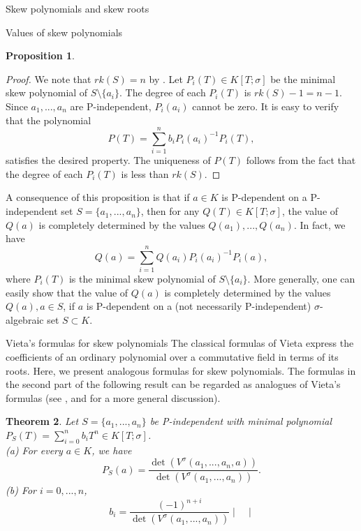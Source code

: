 \documentclass[11pt,a4paper]{article}
\theoremstyle{theorem}
\newtheorem{theorem}{Theorem}[section]
\newtheorem{proposition}[theorem]{Proposition}
\numberwithin{equation}{section}
\newcommand{\s}{\sigma}
\begin{document}
\begin{section}{Skew polynomials and skew roots}
\begin{subsection}{Values of skew polynomials}
\begin{proposition}
	 \end{proposition}
	 \begin{proof}
	 	We note that $rk(S)=n$ by  \cite[Lemma 12]{lam1985general}. Let $P_i(T)\in K[T;\s]$ be the minimal skew polynomial of $S\setminus \{a_i\}$. The degree of each $P_i(T)$ is $rk (S)-1=n-1$. Since $a_1,...,a_n$ are P-independent, $P_i(a_i)$ cannot be zero. It is easy to verify that the polynomial 
	 	$$P(T)=\sum_{i=1}^nb_iP_i(a_i)^{-1}P_i(T),$$
	 	satisfies the desired property. The uniqueness of $P(T)$ follows from the fact that  the degree of each $P_i(T)$ is less than $rk (S)$. 
	 \end{proof}  
 	A consequence of this proposition is that if $a\in K$ is P-dependent on a P-independent set $S=\{a_1,...,a_n\}$, then for any $Q(T)\in K[T;\s]$, the value of $Q(a)$ is completely determined by the values $Q(a_1),...,Q(a_n)$. In fact, we have 
 	$$Q(a)=\sum_{i=1}^nQ(a_i)P_i(a_i)^{-1}P_i(a),$$
	where $P_i(T)$ is the minimal skew polynomial of $S\setminus \{a_i\}$. More generally, one can easily show that the value of $Q(a)$ is completely determined by the values $Q(a), a\in S$, if $a$ is P-dependent on a (not necessarily P-independent) $\s$-algebraic set $S\subset K$.   	 
\end{subsection}
\begin{subsection}{Vieta's formulas for skew polynomials }
	The classical formulas of Vieta express the coefficients of an ordinary polynomial over a commutative field in terms of its roots. 
	 Here, we present analogous formulas for skew polynomials.    	
	The formulas in the second part of the following result can be regarded as analogues of Vieta's formulas (see  \cite{delenclos2007noncommutative}, \cite[Section 7.2]{Gelfandetal1995study} and \cite{gelfand1996noncommutative} for a more general discussion). 
	\begin{theorem}\label{(T)Vieta}
		Let $S=\{a_1,...,a_n\}$ be P-independent with minimal polynomial $P_S(T)=\sum_{i=0}^nb_i T^n\in K[T;\s]$. \\
		(a) For every $a\in K$, we have
		$$P_S(a)=\frac{ \det \left( V^\s(a_1,...,a_n,a)\right)  }{\det \left( V^\s(a_1,...,a_n)\right) }.$$
		(b) For $i=0,...,n$, 
		\begin{equation}\label{(F)MinimalVandermonde}
			b_i=\frac{(-1)^{n+i}}{\det \left( V^\s(a_1,...,a_n)\right)}\begin{vmatrix}

\end{vmatrix}
\end{equation}
\end{theorem}
\end{subsection}
\end{section}
\end{document}

